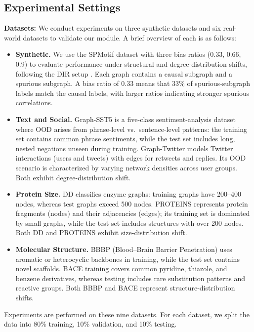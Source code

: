 \documentclass[a4paper,fleqn]{cas-dc}
\begin{document}
\subsection{Experimental Settings}
\textbf{Datasets:} We conduct experiments on three synthetic datasets and six real-world datasets to validate our module. A brief overview of each is as follows:
\begin{itemize}
\item \textbf{Synthetic.} We use the SPMotif dataset with three bias ratios (0.33, 0.66, 0.9) to evaluate performance under structural and degree-distribution shifts, following the DIR setup \cite{wu2022discovering}. Each graph contains a causal subgraph and a spurious subgraph. A bias ratio of 0.33 means that 33\% of spurious-subgraph labels match the causal labels, with larger ratios indicating stronger spurious correlations.
\item \textbf{Text and Social.} Graph-SST5 \cite{socher2013recursive} is a five-class sentiment-analysis dataset where OOD arises from phrase-level vs.\ sentence-level patterns: the training set contains common phrase sentiments, while the test set includes long, nested negations unseen during training. Graph-Twitter \cite{dong2014adaptive} models Twitter interactions (users and tweets) with edges for retweets and replies. Its OOD scenario is characterized by varying network densities across user groups. Both exhibit degree-distribution shift.
\item \textbf{Protein Size.} DD \cite{Morris+2020} classifies enzyme graphs: training graphs have 200--400 nodes, whereas test graphs exceed 500 nodes. PROTEINS \cite{Morris+2020} represents protein fragments (nodes) and their adjacencies (edges); its training set is dominated by small graphs, while the test set includes structures with over 200 nodes. Both DD \cite{Morris+2020} and PROTEINS \cite{Morris+2020} exhibit size-distribution shift.
\item \textbf{Molecular Structure.} BBBP \cite{hu2020open} (Blood–Brain Barrier Penetration) uses aromatic or heterocyclic backbones in training, while the test set contains novel scaffolds. BACE \cite{hu2020open} training covers common pyridine, thiazole, and benzene derivatives, whereas testing includes rare substitution patterns and reactive groups. Both BBBP \cite{hu2020open} and BACE \cite{hu2020open} represent structure-distribution shifts.
\end{itemize}

Experiments are performed on these nine datasets. For each dataset, we split the data into 80\% training, 10\% validation, and 10\% testing.
\end{document}
